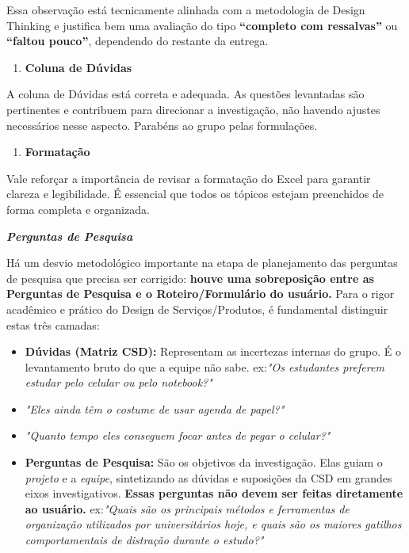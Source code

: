 \documentclass[
  sigconf,
  nonacm, %
  language=portuguese
]{acmart}
\begin{document}
Essa observação está tecnicamente alinhada com a metodologia de Design Thinking e justifica bem uma avaliação do tipo \textbf{“completo com ressalvas”} ou \textbf{“faltou pouco”}, dependendo do restante da entrega.

\begin{enumerate}[leftmargin=14pt,itemsep=2pt,topsep=4pt]
  \item \textbf{Coluna de Dúvidas}
\end{enumerate}

A coluna de Dúvidas está correta e adequada. As questões levantadas são pertinentes e contribuem para direcionar a investigação, não havendo ajustes necessários nesse aspecto. Parabéns ao grupo pelas formulações.

\begin{enumerate}[leftmargin=14pt,itemsep=2pt,topsep=4pt]
  \item \textbf{Formatação}
\end{enumerate}

Vale reforçar a importância de revisar a formatação do Excel para garantir clareza e legibilidade. É essencial que todos os tópicos estejam preenchidos de forma completa e organizada.

\textit{\textbf{Perguntas de Pesquisa}}

Há um desvio metodológico importante na etapa de planejamento das perguntas de pesquisa que precisa ser corrigido: \textbf{houve uma sobreposição entre as Perguntas de Pesquisa e o Roteiro/Formulário do usuário. }Para o rigor acadêmico e prático do Design de Serviços/Produtos, é fundamental distinguir estas três camadas:

\begin{itemize}[leftmargin=14pt,itemsep=2pt,topsep=4pt]
  \item \textbf{Dúvidas (Matriz CSD):} Representam as incertezas internas do grupo. É o levantamento bruto do que a equipe não sabe. ex:\textit{"Os estudantes preferem estudar pelo celular ou pelo notebook?"}
  \item \textit{"Eles ainda têm o costume de usar agenda de papel?"}
  \item \textit{"Quanto tempo eles conseguem focar antes de pegar o celular?"}
\end{itemize}

\begin{itemize}[leftmargin=14pt,itemsep=2pt,topsep=4pt]
  \item \textbf{Perguntas de Pesquisa:} São os objetivos da investigação. Elas guiam o \textit{projeto} e a \textit{equipe}, sintetizando as dúvidas e suposições da CSD em grandes eixos investigativos. \textbf{Essas perguntas não devem ser feitas diretamente ao usuário. }ex:\textit{"Quais são os principais métodos e ferramentas de organização utilizados por universitários hoje, e quais são os maiores gatilhos comportamentais de distração durante o estudo?"}
\end{itemize}
\end{document}
